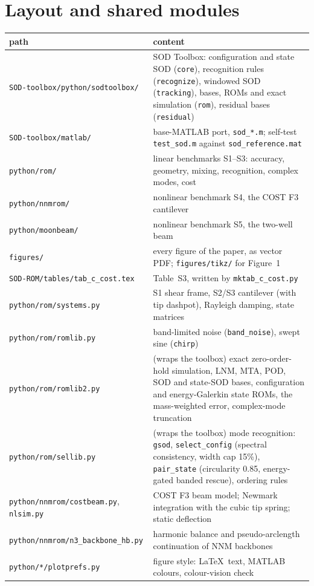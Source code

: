 \documentclass[10pt]{article}
\newcommand{\f}[1]{\texttt{#1}}
\begin{document}
\section{Layout and shared modules}
\begin{longtable}{L{0.30\textwidth}L{0.64\textwidth}}
\toprule
path & content\\ \midrule
\f{SOD-toolbox/\allowbreak{}python/\allowbreak{}sodtoolbox/\allowbreak{}} & SOD Toolbox: configuration and state SOD (\f{core}), recognition rules (\f{recognize}), windowed SOD (\f{tracking}), bases, ROMs and exact simulation (\f{rom}), residual bases (\f{residual})\\
\f{SOD-toolbox/\allowbreak{}matlab/\allowbreak{}} & base-MATLAB port, \f{sod\_\allowbreak{}*.m}; self-test \f{test\_\allowbreak{}sod.m} against \f{sod\_\allowbreak{}reference.mat}\\
\f{python/\allowbreak{}rom/\allowbreak{}} & linear benchmarks S1--S3: accuracy, geometry, mixing, recognition, complex modes, cost\\
\f{python/\allowbreak{}nnmrom/\allowbreak{}} & nonlinear benchmark S4, the COST F3 cantilever\\
\f{python/\allowbreak{}moonbeam/\allowbreak{}} & nonlinear benchmark S5, the two-well beam\\
\f{figures/\allowbreak{}} & every figure of the paper, as vector PDF; \f{figures/\allowbreak{}tikz/\allowbreak{}} for Figure~1\\
\f{SOD-ROM/\allowbreak{}tables/\allowbreak{}tab\_\allowbreak{}c\_\allowbreak{}cost.tex} & Table~S3, written by \f{mktab\_\allowbreak{}c\_\allowbreak{}cost.py}\\
\f{python/\allowbreak{}rom/\allowbreak{}systems.py} & S1 shear frame, S2/S3 cantilever (with tip dashpot), Rayleigh damping, state matrices\\
\f{python/\allowbreak{}rom/\allowbreak{}romlib.py} & band-limited noise (\f{band\_\allowbreak{}noise}), swept sine (\f{chirp})\\
\f{python/\allowbreak{}rom/\allowbreak{}romlib2.py} & (wraps the toolbox) exact zero-order-hold simulation, LNM, MTA, POD, SOD and state-SOD bases, configuration and energy-Galerkin state ROMs, the mass-weighted error, complex-mode truncation\\
\f{python/\allowbreak{}rom/\allowbreak{}sellib.py} & (wraps the toolbox) mode recognition: \f{gsod}, \f{select\_\allowbreak{}config} (spectral consistency, width cap 15\%), \f{pair\_\allowbreak{}state} (circularity 0.85, energy-gated banded rescue), ordering rules\\
\f{python/\allowbreak{}nnmrom/\allowbreak{}costbeam.py}, \f{nlsim.py} & COST F3 beam model; Newmark integration with the cubic tip spring; static deflection\\
\f{python/\allowbreak{}nnmrom/\allowbreak{}n3\_\allowbreak{}backbone\_\allowbreak{}hb.py} & harmonic balance and pseudo-arclength continuation of NNM backbones\\
\f{python/\allowbreak{}*/\allowbreak{}plotprefs.py} & figure style: \LaTeX\ text, MATLAB colours, colour-vision check\\
\bottomrule
\end{longtable}
\end{document}
